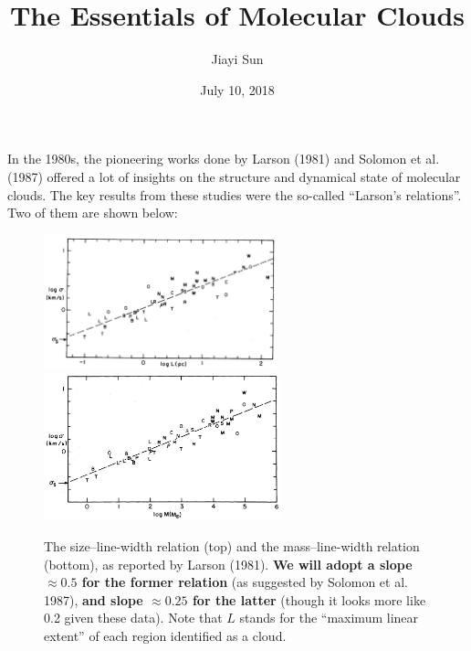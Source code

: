 \documentclass[12pt, letterpaper]{article}
\title{The Essentials of Molecular Clouds}
\author{Jiayi Sun}
\date{July 10, 2018}
\begin{document}
\maketitle

In the 1980s, the pioneering works done by Larson (1981) and Solomon et al. (1987)  offered a lot of insights on the structure and dynamical state of molecular clouds. The key results from these studies were the so-called ``Larson's relations''. Two of them are shown below:

\begin{figure}[htb]
\begin{center}
\includegraphics[width=0.60\textwidth]{1.png}
\includegraphics[width=0.61\textwidth]{2.png}
\caption{The size{--}line-width relation (top) and the mass{--}line-width relation (bottom), as reported by Larson (1981). {\bf We will adopt a slope $\approx 0.5$ for the former relation} (as suggested by Solomon et al. 1987), {\bf and slope $\approx 0.25$ for the latter} (though it looks more like 0.2 given these data). Note that $L$ stands for the ``maximum linear extent'' of each region identified as a cloud.}
\end{center}
\end{figure}
\end{document}
